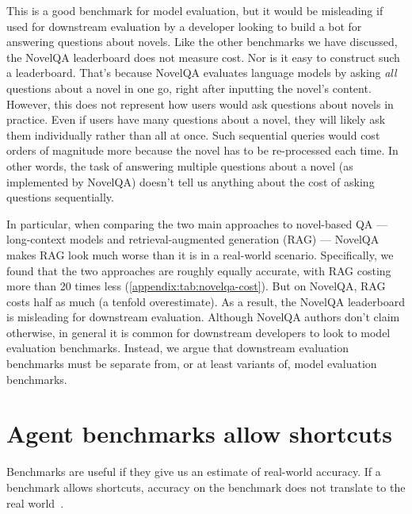 \documentclass{article}
\begin{document}
This is a good benchmark for model evaluation, but it would be misleading if used for downstream evaluation by a developer looking to build a bot for answering questions about novels. Like the other benchmarks we have discussed, the NovelQA leaderboard does not measure cost. Nor is it easy to construct such a leaderboard.
That's because NovelQA evaluates language models by asking \textit{all} questions about a novel in one go, right after inputting the novel's content. 
However, this does not represent how users would ask questions about novels in practice. Even if users have many questions about a novel, they will likely ask them individually rather than all at once. 
Such sequential queries would cost orders of magnitude more because the novel has to be re-processed each time. In other words, the task of answering multiple questions about a novel (as implemented by NovelQA) doesn't tell us anything about the cost of asking questions sequentially.

In particular, when comparing the two main approaches to novel-based QA --- long-context models and retrieval-augmented generation (RAG) --- NovelQA makes RAG look much worse than it is in a real-world scenario. Specifically, we found that the two approaches are roughly equally accurate, with RAG costing more than 20 times less (\cref{appendix:tab:novelqa-cost}). But on NovelQA, RAG costs half as much (a tenfold overestimate). As a result, the NovelQA leaderboard is misleading for downstream evaluation. Although NovelQA authors don't claim otherwise, in general it is common for downstream developers to look to model evaluation benchmarks. Instead, we argue that downstream evaluation benchmarks must be separate from, or at least variants of, model evaluation benchmarks.





\section{Agent benchmarks allow shortcuts}\label{sec:construct-validity}

Benchmarks are useful if they give us an estimate of real-world accuracy. If a benchmark allows shortcuts, accuracy on the benchmark does not translate to the real world~\citep{mcintosh_inadequacies_2024, mialon_gaia_2023, wagstaff_machine_2012}.
\end{document}
